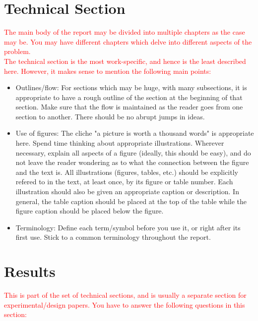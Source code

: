 \documentclass[fyp]{socreport}
\begin{document}
\chapter{Technical Section}
\label{ch:technical}
\textcolor{red}{The main body of the report may be divided into multiple chapters as the case may be. You may have different chapters which delve into different aspects of the problem. \\ The technical section is the most work-specific, and hence is the least described here. However, it makes sense to mention the following main points:}

\begin{itemize}
    \color{red}
    \item Outlines/flow: For sections which may be huge, with many subsections, it is appropriate to have a rough outline of the section at the beginning of that section. Make sure that the flow is maintained as the reader goes from one section to another. There should be no abrupt jumps in ideas.
    \item Use of figures: The cliche "a picture is worth a thousand words" is appropriate here. Spend time thinking about appropriate illustrations. Wherever necessary, explain all aspects of a figure (ideally, this should be easy), and do not leave the reader wondering as to what the connection between the figure and the text is. All illustrations (figures, tables, etc.) should be explicitly refered to in the text, at least once, by its figure or table number. Each illustration should also be given an appropriate caption or description. In general, the table caption should be placed at the top of the table while the figure caption should be placed below the figure.
    \item Terminology: Define each term/symbol before you use it, or right after its first use. Stick to a common terminology throughout the report.
\end{itemize}

\chapter{Results}
\textcolor{red}{This is part of the set of technical sections, and is usually a separate section for experimental/design papers. You have to answer the following questions in this section:}
\end{document}
